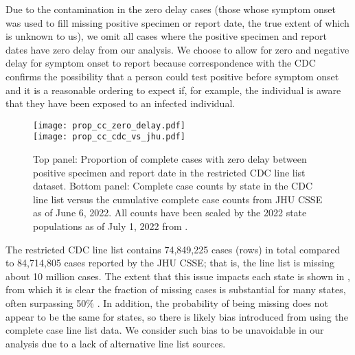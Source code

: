 Due to the contamination in the zero delay cases (those whose symptom onset was
used to fill missing positive specimen or report date, the true extent of which
is unknown to us), we omit all cases where the positive specimen and report
dates have zero delay from our analysis. We choose to allow for zero and
negative delay for symptom onset to report because correspondence with the CDC
confirms the possibility that a person could test positive before symptom onset
and it is a reasonable ordering to expect if, for example, the individual is
aware that they have been exposed to an infected individual.

\begin{figure}[!tb]
\centering
\texttt{[image: prop\_cc\_zero\_delay.pdf]}\\
\texttt{[image: prop\_cc\_cdc\_vs\_jhu.pdf]} 
\caption{Top panel: Proportion of complete cases with zero delay between
    positive specimen and report date in the restricted CDC line list dataset.
    Bottom panel: Complete case counts by state in the CDC line list versus the
    cumulative complete case counts from JHU CSSE as of June 6, 2022. All
    counts have been scaled by the 2022 state populations as of July 1, 2022
    from \citep{uscensus2022annual}.}
\label{fig:prop-cc}
\end{figure}

The restricted CDC line list contains 74,849,225 cases (rows) in total compared
to 84,714,805 cases reported by the JHU CSSE; that is, the line list is missing
about 10 million cases. The extent that this issue impacts each state is shown
in , from which it is clear the fraction of missing cases is
substantial for many states, often surpassing 50\% \citep{jahja2022real}. In
addition, the probability of being missing does not appear to be the same for
states, so there is likely bias introduced from using the complete case line
list data. We consider such bias to be unavoidable in our analysis due to a lack
of alternative line list sources. 





